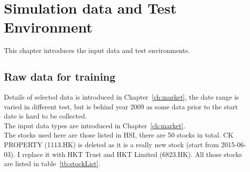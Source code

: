 \chapter{Simulation data and Test Environment}
\label{ch:dataAndEnv}

This chapter introduces the input data and test environments.

\section{Raw data for training}
Details of selected data is introduced in Chapter~\ref{ch:market}, the date range is varied in different test, but is behind year 2009 as some data prior to the start date is hard to be collected. \\

The input data types are introduced in Chapter~\ref{ch:market}.\\

The stocks used here are those listed in HSI, there are 50 stocks in total. CK PROPERTY (1113.HK) is deleted as it is a really new stock (start from 2015-06-03). I replace it with HKT Trust and HKT Limited (6823.HK). All those stocks are listed in table~\ref{tb:stockList}.\\

